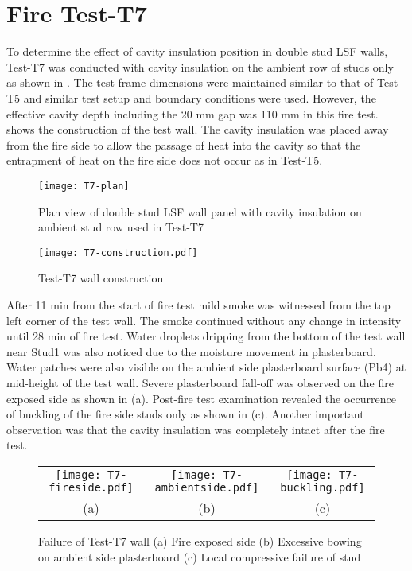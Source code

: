 \section{Fire Test-T7}

To determine the effect of cavity insulation position in double stud LSF walls, Test-T7 was conducted with cavity insulation on the ambient row of studs only as shown in . The test frame dimensions were maintained similar to that of Test-T5 and similar test setup and boundary conditions were used. However, the effective cavity depth including the 20 mm gap was 110 mm in this fire test.  shows the construction of the test wall. The cavity insulation was placed away from the fire side to allow the passage of heat into the cavity so that the entrapment of heat on the fire side does not occur as in Test-T5. 
\begin{figure}[!htbp]
	\centering
		\texttt{[image: T7-plan]}
		\caption{Plan view of double stud LSF wall panel with cavity insulation on ambient stud row used in Test-T7}
		\label{fig:T7-plan}
\end{figure}
\begin{figure}[htbp]
	\centering
	\texttt{[image: T7-construction.pdf]}
	\caption{Test-T7 wall construction}
	\label{fig:T7-construction}
\end{figure}

After 11 min from the start of fire test mild smoke was witnessed from the top left corner of the test wall. The smoke continued without any change in  intensity until 28 min of fire test. Water droplets dripping from the bottom of the test wall near Stud1 was also noticed due to the moisture movement in plasterboard. Water patches were also visible on the ambient side plasterboard surface (Pb4) at mid-height of the test wall. Severe plasterboard fall-off was observed on the fire exposed side as shown in  (a). Post-fire test examination revealed the occurrence of buckling of the fire side studs only as shown in  (c). Another important observation was that the cavity insulation was completely intact after the fire test. 
\begin{figure}[!htbp]
	\centering	
		\begin{tabular}{ccc}
			\texttt{[image: T7-fireside.pdf]} & 
			\texttt{[image: T7-ambientside.pdf]} & 
			\texttt{[image: T7-buckling.pdf]} \\
			(a) & (b) & (c) \\
			\end{tabular}
		\caption{Failure of Test-T7 wall (a) Fire exposed side (b) Excessive bowing on ambient side plasterboard (c) Local compressive failure of stud}
		\label{fig:T7-failure}
\end{figure}

